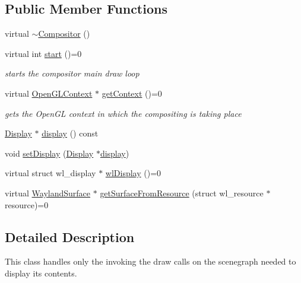 \subsection*{Public Member Functions}
\begin{DoxyCompactItemize}
\item 
virtual \hyperlink{classmotorcar_1_1Compositor_ab9963bdfdd7deafdaec1a5ebf8f2d97b}{$\sim$\-Compositor} ()
\item 
virtual int \hyperlink{classmotorcar_1_1Compositor_a9d4b703e99386360996087a1100fae52}{start} ()=0
\begin{DoxyCompactList}\small\item\em starts the compositor main draw loop \end{DoxyCompactList}\item 
virtual \hyperlink{classmotorcar_1_1OpenGLContext}{Open\-G\-L\-Context} $\ast$ \hyperlink{classmotorcar_1_1Compositor_afb0a16529f65b5e2ecf8f15524680c57}{get\-Context} ()=0
\begin{DoxyCompactList}\small\item\em gets the Open\-G\-L context in which the compositing is taking place \end{DoxyCompactList}\item 
\hyperlink{classmotorcar_1_1Display}{Display} $\ast$ \hyperlink{classmotorcar_1_1Compositor_a101830d8941b3d51a57e224950240cfe}{display} () const 
\item 
void \hyperlink{classmotorcar_1_1Compositor_a432fe3ad3e6ff3e22c61b3dc98f719f6}{set\-Display} (\hyperlink{classmotorcar_1_1Display}{Display} $\ast$\hyperlink{structdisplay}{display})
\item 
virtual struct wl\-\_\-display $\ast$ \hyperlink{classmotorcar_1_1Compositor_a19115510ba397b13d439eac5323ea998}{wl\-Display} ()=0
\item 
virtual \hyperlink{classmotorcar_1_1WaylandSurface}{Wayland\-Surface} $\ast$ \hyperlink{classmotorcar_1_1Compositor_abc7e49b58794334e99a0433389a39929}{get\-Surface\-From\-Resource} (struct wl\-\_\-resource $\ast$resource)=0
\end{DoxyCompactItemize}


\subsection{Detailed Description}
This class handles only the invoking the draw calls on the scenegraph needed to display its contents. 

